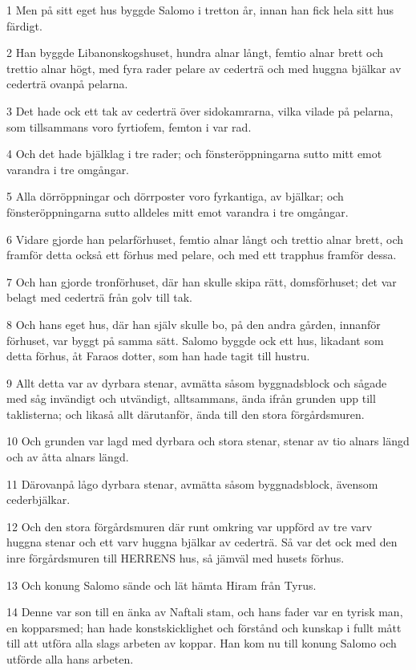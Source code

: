 \par 1 Men på sitt eget hus byggde Salomo i tretton år, innan han fick hela sitt hus färdigt.
\par 2 Han byggde Libanonskogshuset, hundra alnar långt, femtio alnar brett och trettio alnar högt, med fyra rader pelare av cederträ och med huggna bjälkar av cederträ ovanpå pelarna.
\par 3 Det hade ock ett tak av cederträ över sidokamrarna, vilka vilade på pelarna, som tillsammans voro fyrtiofem, femton i var rad.
\par 4 Och det hade bjälklag i tre rader; och fönsteröppningarna sutto mitt emot varandra i tre omgångar.
\par 5 Alla dörröppningar och dörrposter voro fyrkantiga, av bjälkar; och fönsteröppningarna sutto alldeles mitt emot varandra i tre omgångar.
\par 6 Vidare gjorde han pelarförhuset, femtio alnar långt och trettio alnar brett, och framför detta också ett förhus med pelare, och med ett trapphus framför dessa.
\par 7 Och han gjorde tronförhuset, där han skulle skipa rätt, domsförhuset; det var belagt med cederträ från golv till tak.
\par 8 Och hans eget hus, där han själv skulle bo, på den andra gården, innanför förhuset, var byggt på samma sätt. Salomo byggde ock ett hus, likadant som detta förhus, åt Faraos dotter, som han hade tagit till hustru.
\par 9 Allt detta var av dyrbara stenar, avmätta såsom byggnadsblock och sågade med såg invändigt och utvändigt, alltsammans, ända ifrån grunden upp till taklisterna; och likaså allt därutanför, ända till den stora förgårdsmuren.
\par 10 Och grunden var lagd med dyrbara och stora stenar, stenar av tio alnars längd och av åtta alnars längd.
\par 11 Därovanpå lågo dyrbara stenar, avmätta såsom byggnadsblock, ävensom cederbjälkar.
\par 12 Och den stora förgårdsmuren där runt omkring var uppförd av tre varv huggna stenar och ett varv huggna bjälkar av cederträ. Så var det ock med den inre förgårdsmuren till HERRENS hus, så jämväl med husets förhus.
\par 13 Och konung Salomo sände och lät hämta Hiram från Tyrus.
\par 14 Denne var son till en änka av Naftali stam, och hans fader var en tyrisk man, en kopparsmed; han hade konstskicklighet och förstånd och kunskap i fullt mått till att utföra alla slags arbeten av koppar. Han kom nu till konung Salomo och utförde alla hans arbeten.
